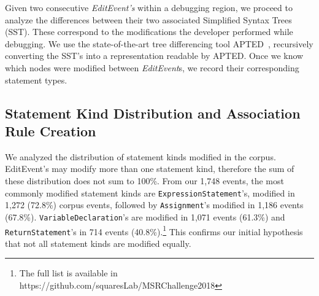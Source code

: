 \documentclass[sigconf]{acmart}
\begin{document}
Given two consecutive \textit{EditEvent's} within
a debugging region, we proceed to analyze the differences
between their two associated Simplified Syntax Trees (SST).
These correspond to the modifications the developer performed
while debugging.
We use the 
state-of-the-art tree differencing
tool APTED~\cite{Pawlik16Apted}, recursively converting the SST's into a
representation readable by APTED. 
Once we know which nodes were modified between \textit{EditEvent}s, we record
their corresponding statement types. 

\subsection{Statement Kind Distribution and Association Rule Creation}

We analyzed the distribution of statement kinds modified
in the corpus.  EditEvent's may modify more than one
statement kind, therefore the sum of these distribution
does not sum to 100\%.
From our 1,748 events, the most commonly modified statement
kinds are \texttt{ExpressionStatement}'s, modified in 1,272 (72.8\%) 
corpus events,
followed by \texttt{Assignment}'s modified in 1,186 
events (67.8\%). \texttt{VariableDeclaration}'s are modified in 1,071
events (61.3\%) and \texttt{ReturnStatement}'s in 714
events (40.8\%).\footnote{The full list is available in 
https://github.com/squaresLab/MSRChallenge2018} This confirms our initial hypothesis that
not all statement kinds are modified equally.


\end{document}
